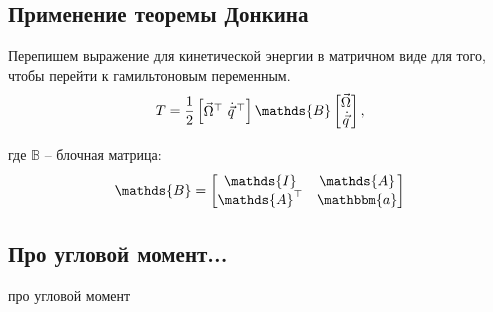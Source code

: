 \documentclass[12pt]{article}
\newcommand{\bbA}{\mathds{A}}
\newcommand{\bbI}{\mathds{I}}
\newcommand{\bbB}{\mathds{B}}
\newcommand{\bba}{\mathbbm{a}}
\begin{document}
\subsection{Применение теоремы Донкина}
Перепишем выражение для кинетической энергии в матричном виде для того, чтобы перейти к гамильтоновым переменным.
\begin{gather}
T = \frac{1}{2} 
\begin{bmatrix}
\vec{\Omega}^{\top} \ \dot{\vec{q}}^{\, \top}
\end{bmatrix}
\bbB
\begin{bmatrix}
\vec{\Omega} \\
\dot{\vec{q}}
\end{bmatrix}, \notag
\end{gather}

где $\bbB$ -- блочная матрица:
\begin{gather}
\bbB = 
\begin{bmatrix}
\bbI & \bbA \\
\bbA^\top & \bba
\end{bmatrix}
\end{gather}  


\newpage
\begin{appendices}
\section{Про угловой момент...}
про угловой момент
\end{appendices}
\end{document}

